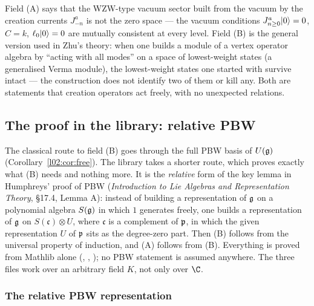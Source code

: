 \begin{physics}
Field (A) says that the WZW-type vacuum sector built from the vacuum by the creation currents
$J^a_{-n}$ is not the zero space --- the vacuum conditions $J^a_{n\ge0}|0\rangle = 0$, $C = k$,
$\ell_0|0\rangle = 0$ are mutually consistent at every level. Field (B) is the general version used in Zhu's
theory: when one builds a module of a vertex operator algebra by ``acting with all modes'' on a space of
lowest-weight states (a generalised Verma module), the lowest-weight states one started with survive
intact --- the construction does not identify two of them or kill any. Both are statements that
creation operators act freely, with no unexpected relations.
\end{physics}

\subsection{The proof in the library: relative PBW}\label{l02:sec:pbwproof}

The classical route to field (B) goes through the full PBW basis of $U(\mathfrak{g})$
(Corollary~\ref{l02:cor:free}). The library takes a shorter route, which proves exactly what (B) needs
and nothing more. It is the \emph{relative} form of the key lemma in Humphreys' proof of PBW
(\emph{Introduction to Lie Algebras and Representation Theory}, \S17.4, Lemma A): instead of building a
representation of $\mathfrak{g}$ on a polynomial algebra $S(\mathfrak{g})$ in which $1$ generates freely, one builds a
representation of $\mathfrak{g}$ on $S(\mathfrak c)\otimes U$, where $\mathfrak c$ is a complement of $\mathfrak{p}$, in
which the given representation $U$ of $\mathfrak{p}$ sits as the degree-zero part. Then (B) follows from the
universal property of induction, and (A) follows from (B). Everything is proved from Mathlib alone
(,
, ); no PBW statement is assumed anywhere. The three files
work over an arbitrary field $K$, not only over $\C$.

\subsubsection{The relative PBW representation}

